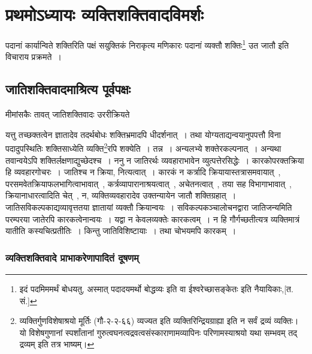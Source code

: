 \chapter{प्रथमोऽध्यायः  व्यक्तिशक्तिवादविमर्शः}

	पदानां कार्यान्विते शक्तिरिति पक्षं सयुक्तिकं निराकृत्य मणिकारः पदानां व्यक्तौ शक्तिः\footnote{इदं पदमिममर्थं बोधयतु, अस्मात् पदादयमर्थो बोद्धव्यः इति वा ईश्वरेच्छासङ्केतः इति नैयायिकाः,[त. सं.]} उत जातौ इति विचाराय प्रक्रमते~।

	\section{जातिशक्तिवादमाश्रित्य पूर्वपक्षः}

		मीमांसकैः तावत् जातिशक्तिवादः उररीक्रियते
			
		\begin{small}
	
			यत्तु तच्छक्तत्वेन ज्ञातादेव तदर्थबोधः शक्तिभ्रमादपि धीदर्शनात्~। तथा योग्यताद्यन्वयानुपपत्तौ विना पदादुपस्थितिः शक्तिसाध्येति व्यक्ति\footnote{व्यक्तिर्गुणविशेषाश्रयो मूर्तिः (गौ-२-२-६६) व्यज्यत इति व्यक्तिरिन्द्रियग्राह्या इति न सर्वं द्रव्यं व्यक्तिः। यो विशेषगुणानां स्पर्शांतानां गुरुत्वघनत्वद्रवत्वसंस्काराणामव्यापिनः परिणामस्याश्रयो यथा सम्भवम् तद् द्रव्यम् इति तत्र भाष्यम्।}रपि शक्येति~। तन्न~। अन्यलभ्ये शक्तेरकल्पनात्~। अन्यथा तवान्वयेऽपि शक्तिर्लक्षणाद्युच्छेदश्च~। ननु न जातिरर्थः व्यवहाराभावेन व्युत्पत्तेरसिद्धेः~। कारकोपरक्तक्रिया हि व्यवहारगोचरः~। जातिश्च न क्रिया, नित्यत्वात्~। कारकं न कर्त्रादि क्रियायास्तत्रासमवायात्~, परसमवेतक्रियाफलभागित्वाभावात्~, कर्त्रव्यापारानाश्रयत्वात्~, अचेतनत्वात्~, तया सह विभागाभावात्~, क्रियानाधारत्वादिति चेत्~, न, व्यक्तिव्यवहारादेव उक्तन्यायेन जातौ शक्तिग्रहात्~। जातिसविकल्पकाद्यव्यावृत्ततया ज्ञातायां व्यक्तौ क्रियान्वयः~। सविकल्पकञ्चालोचनद्वारा जातिजन्यमिति परम्परया जातेरपि कारकत्वेनान्वयः~। यद्वा न केवलव्यक्तेः कारकत्वम्~। न हि गौर्गच्छतीत्यत्र व्यक्तिमात्रं यातीति कस्यचित्प्रतीतिः~। किन्तु जातिविशिष्टायाः~। तथा चोभयमपि कारकम्~।
		\end{small}	
			\subsection{व्यक्तिशक्तिवादे प्राभाकरेणापादितं दूषणम् }
			

